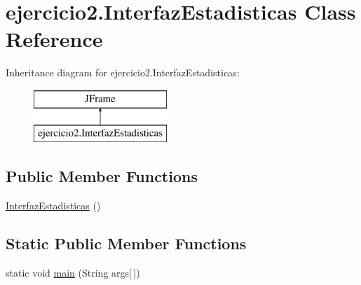 \hypertarget{classejercicio2_1_1_interfaz_estadisticas}{}\section{ejercicio2.\+Interfaz\+Estadisticas Class Reference}
\label{classejercicio2_1_1_interfaz_estadisticas}
Inheritance diagram for ejercicio2.\+Interfaz\+Estadisticas\+:\begin{figure}[H]
\begin{center}
\leavevmode
\includegraphics[height=2.000000cm]{classejercicio2_1_1_interfaz_estadisticas}
\end{center}
\end{figure}
\subsection*{Public Member Functions}
\begin{DoxyCompactItemize}
\item 
\mbox{\hyperlink{classejercicio2_1_1_interfaz_estadisticas_a5d6221be6e64b17456cb3530ba3f7368}{Interfaz\+Estadisticas}} ()
\end{DoxyCompactItemize}
\subsection*{Static Public Member Functions}
\begin{DoxyCompactItemize}
\item 
static void \mbox{\hyperlink{classejercicio2_1_1_interfaz_estadisticas_ae9fe09afc5dec107cc367f1f90ba25b6}{main}} (String args\mbox{[}$\,$\mbox{]})
\end{DoxyCompactItemize}

